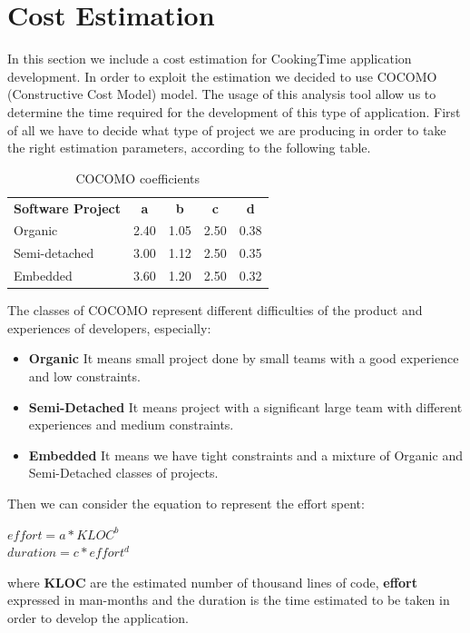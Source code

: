 \chapter{Cost Estimation}
In this section we include a cost estimation for CookingTime application development.
In order to exploit the estimation we decided to use COCOMO (Constructive Cost Model) model.
The usage of this analysis tool allow us to determine the time required for the development of this type of application.
First of all we have to decide what type of project we are producing in order to take the right estimation parameters, according to the following table.\\
\begin{table}[H]
	\centering
	\begin{tabular}{|l|c|c|c|c|}
	\textbf{Software Project}& \textbf{a}& \textbf{b}& \textbf{c}& \textbf{d}\\
	Organic & 2.40 & 1.05 & 2.50 & 0.38 \\
	Semi-detached & 3.00 & 1.12 & 2.50 & 0.35 \\
	Embedded & 3.60 & 1.20 & 2.50 & 0.32 \\
	\end{tabular}
	\caption{COCOMO coefficients}
\end{table}
The classes of COCOMO represent different difficulties of the product and experiences of developers, especially:
\begin{itemize}
	\item \textbf{Organic} It means small project done by small teams with a good experience and low constraints.
	\item \textbf{Semi-Detached} It means project with a significant large team with different experiences and medium constraints.
	\item \textbf{Embedded} It means we have tight constraints and a mixture of Organic and Semi-Detached classes of projects.
\end{itemize}
Then we can consider the equation to represent the effort spent:\\
\begin{center}
$ effort = a * KLOC ^{b}$\\
$ duration = c * effort^{d}$\\
\end{center}
where \textbf{KLOC} are the estimated number of thousand lines of code, \textbf{effort} expressed in man-months and the duration is the time estimated to be taken in order to develop the application.\\
